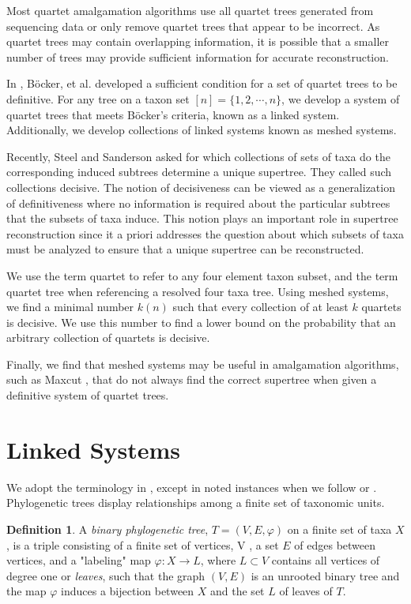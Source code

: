 \documentclass[final,3p,times]{elsarticle}
\theoremstyle{definition}
\newtheorem{defn}[thm]{Definition}
\theoremstyle{remark}
\begin{document}
Most quartet amalgamation algorithms use all quartet trees generated from sequencing data or only remove quartet trees that appear to be incorrect. As quartet trees may contain overlapping information, it is possible that a smaller number of trees may provide sufficient information for accurate reconstruction. 

In \cite{bocker1998}, B{\"o}cker, et al. developed a sufficient condition for a set of quartet trees to be definitive.  For any tree on a taxon set $[n]=\{1,2,\cdots, n\}$, we develop a system of quartet trees that meets B{\"o}cker’s criteria, known as a linked system. Additionally, we develop collections of linked systems known as meshed systems.

Recently, Steel and Sanderson asked for which collections of sets of taxa do the corresponding induced subtrees determine a unique supertree. They called such collections decisive. The notion of decisiveness can be viewed as a generalization of definitiveness where no information is required about the particular subtrees that the subsets of taxa induce.  This notion plays an important role in supertree reconstruction since it a priori addresses the question about which subsets of taxa must be analyzed to ensure that a unique supertree can be reconstructed.

We use the term quartet to refer to any four element taxon subset, and the term quartet tree when referencing a resolved four taxa tree. Using meshed systems, we find a minimal number $k(n)$ such that every collection of at least $k$ quartets is decisive. We use this number to find a lower bound on the probability that an arbitrary collection of quartets is decisive. 

Finally, we find that meshed systems may be useful in amalgamation algorithms, such as Maxcut \cite{snir}, that do not always find the correct supertree when given a definitive system of quartet trees. 


\section{Linked Systems}

We adopt the terminology in \cite{huber}, except in noted instances when we follow \cite{semple} or \cite{steel}.  Phylogenetic trees display relationships among a finite set of taxonomic units. 

\begin{defn}
A \emph{binary phylogenetic tree}, $T=(V,E,\varphi)$ on a finite set of taxa $X$, is a triple consisting of a finite set of vertices, V , a set $E$ of edges between vertices, and a "labeling" map $\varphi : X \rightarrow L$, where $L \subset V$ contains all vertices of degree one or \emph{leaves}, such that the graph $(V,E)$ is an unrooted binary tree and
the map $\varphi$ induces a bijection between $X$ and the set $L$ of leaves of $T$.
\end{defn}
\end{document}
